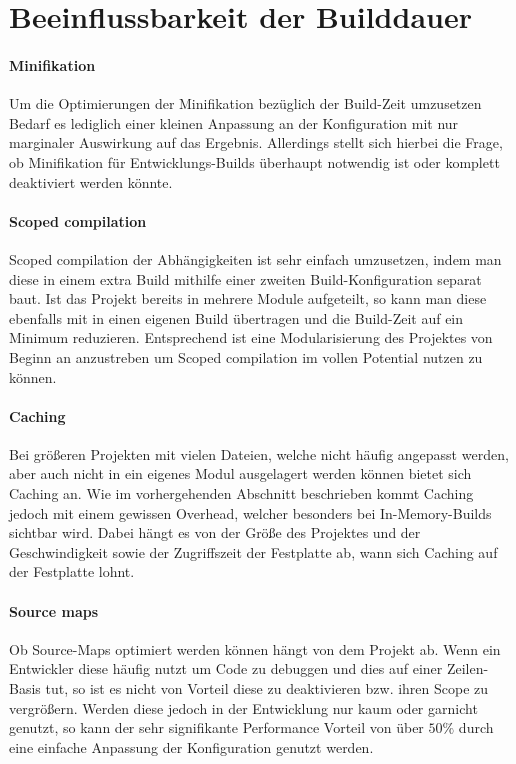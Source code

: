 \documentclass[11pt]{report}
\begin{document}
		
		\section{Beeinflussbarkeit der Builddauer}
			\paragraph{Minifikation} Um die Optimierungen der Minifikation bezüglich der Build-Zeit umzusetzen Bedarf es lediglich einer kleinen Anpassung an der Konfiguration mit nur marginaler Auswirkung auf das Ergebnis. Allerdings stellt sich hierbei die Frage, ob Minifikation für Entwicklungs-Builds überhaupt notwendig ist oder komplett deaktiviert werden könnte. 
			\paragraph{Scoped compilation} Scoped compilation der Abhängigkeiten ist sehr einfach umzusetzen, indem man diese in einem extra Build mithilfe einer zweiten Build-Konfiguration separat baut. Ist das Projekt bereits in mehrere Module aufgeteilt, so kann man diese ebenfalls mit in einen eigenen Build übertragen und die Build-Zeit auf ein Minimum reduzieren. Entsprechend ist eine Modularisierung des Projektes von Beginn an anzustreben um Scoped compilation im vollen Potential nutzen zu können.
			\paragraph{Caching} Bei größeren Projekten mit vielen Dateien, welche nicht häufig angepasst werden, aber auch nicht in ein eigenes Modul ausgelagert werden können bietet sich Caching an. Wie im vorhergehenden Abschnitt beschrieben kommt Caching jedoch mit einem gewissen Overhead, welcher besonders bei In-Memory-Builds sichtbar wird. Dabei hängt es von der Größe des Projektes und der Geschwindigkeit sowie der Zugriffszeit der Festplatte ab, wann sich Caching auf der Festplatte lohnt.
			\paragraph{Source maps} Ob Source-Maps optimiert werden können hängt von dem Projekt ab. Wenn ein Entwickler diese häufig nutzt um Code zu debuggen und dies auf einer Zeilen-Basis tut, so ist es nicht von Vorteil diese zu deaktivieren bzw. ihren Scope zu vergrößern. Werden diese jedoch in der Entwicklung nur kaum oder garnicht genutzt, so kann der sehr signifikante Performance Vorteil von über $50\%$ durch eine einfache Anpassung der Konfiguration genutzt werden.
\end{document}
